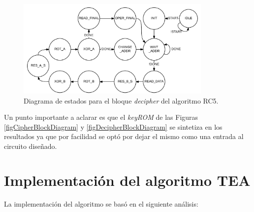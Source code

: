 \begin{figure}
	\centering
	\includegraphics[width=0.85\textwidth]{./images/figDecipherFSM}
	\caption{Diagrama de estados para el bloque \textit{decipher} del algoritmo RC5.}
	\label{figDecipherFSM}
\end{figure}

Un punto importante a aclarar es que el \textit{keyROM} de las Figuras \ref{figCipherBlockDiagram} y \ref{figDecipherBlockDiagram} se sintetiza en los resultados ya que por facilidad se optó por dejar el mismo como una entrada al circuito diseñado.


\section{Implementación del algoritmo TEA}
La implementación del algoritmo se basó en el siguiente análisis:

